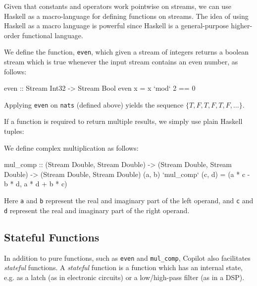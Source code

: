 Given that constants and operators work pointwise on streams, we can use Haskell
as a macro-language for defining functions on streams.  The idea of using
Haskell as a macro language is powerful since Haskell is a
general-purpose higher-order functional language.

\begin{example}
We define the function, {\tt even}, which given a stream of
integers returns a boolean stream which is true whenever the input stream
contains an even number, as follows:
%
\begin{code}
even :: Stream Int32 -> Stream Bool
even x = x `mod` 2 == 0
\end{code}
%
Applying {\tt even} on {\tt nats} (defined above) yields the sequence
$\{T, F, T, F, T, F, \dots\}$.
\end{example}

If a function is required to return multiple results, we simply use plain
Haskell tuples:

\begin{example}
We define complex multiplication as follows:
%
\begin{code}
mul_comp
  :: (Stream Double, Stream Double)
  -> (Stream Double, Stream Double)
  -> (Stream Double, Stream Double)
(a, b) `mul_comp` (c, d) = (a * c - b * d, a * d + b * c)
\end{code}
%
Here {\tt a} and {\tt b} represent the real and imaginary part of the left
operand, and {\tt c} and {\tt d} represent the real and imaginary part
of the right operand.
\end{example}

\subsection{Stateful Functions} \label{sec:stateful}

In addition to pure functions, such as {\tt even} and {\tt mul\_comp},
Copilot also facilitates \emph{stateful} functions. A \emph{stateful} function
is a function which has an internal state, e.g. as a latch (as in electronic
circuits) or a low/high-pass filter (as in a DSP).

